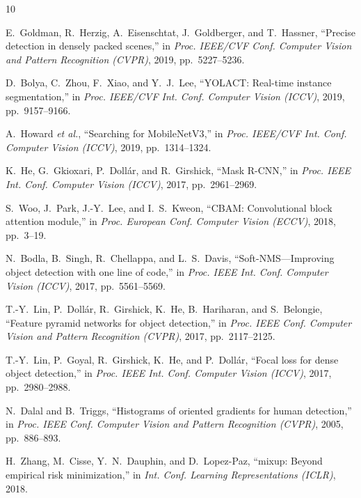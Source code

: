 \documentclass[conference]{IEEEtran}
\begin{document}
\begin{thebibliography}{10}

E.~Goldman, R.~Herzig, A.~Eisenschtat, J.~Goldberger, and T.~Hassner,
``Precise detection in densely packed scenes,''
in \emph{Proc. IEEE/CVF Conf. Computer Vision and Pattern Recognition (CVPR)}, 2019, pp.~5227--5236.

D.~Bolya, C.~Zhou, F.~Xiao, and Y.~J.~Lee,
``{YOLACT}: Real-time instance segmentation,''
in \emph{Proc. IEEE/CVF Int. Conf. Computer Vision (ICCV)}, 2019, pp.~9157--9166.

A.~Howard \emph{et al.},
``Searching for {MobileNetV3},''
in \emph{Proc. IEEE/CVF Int. Conf. Computer Vision (ICCV)}, 2019, pp.~1314--1324.

K.~He, G.~Gkioxari, P.~Doll{\'a}r, and R.~Girshick,
``Mask {R-CNN},''
in \emph{Proc. IEEE Int. Conf. Computer Vision (ICCV)}, 2017, pp.~2961--2969.

S.~Woo, J.~Park, J.-Y.~Lee, and I.~S.~Kweon,
``{CBAM}: Convolutional block attention module,''
in \emph{Proc. European Conf. Computer Vision (ECCV)}, 2018, pp.~3--19.

N.~Bodla, B.~Singh, R.~Chellappa, and L.~S.~Davis,
``Soft-{NMS}---Improving object detection with one line of code,''
in \emph{Proc. IEEE Int. Conf. Computer Vision (ICCV)}, 2017, pp.~5561--5569.

T.-Y.~Lin, P.~Doll{\'a}r, R.~Girshick, K.~He, B.~Hariharan, and S.~Belongie,
``Feature pyramid networks for object detection,''
in \emph{Proc. IEEE Conf. Computer Vision and Pattern Recognition (CVPR)}, 2017, pp.~2117--2125.

T.-Y.~Lin, P.~Goyal, R.~Girshick, K.~He, and P.~Doll{\'a}r,
``Focal loss for dense object detection,''
in \emph{Proc. IEEE Int. Conf. Computer Vision (ICCV)}, 2017, pp.~2980--2988.

N.~Dalal and B.~Triggs,
``Histograms of oriented gradients for human detection,''
in \emph{Proc. IEEE Conf. Computer Vision and Pattern Recognition (CVPR)}, 2005, pp.~886--893.

H.~Zhang, M.~Cisse, Y.~N.~Dauphin, and D.~Lopez-Paz,
``mixup: Beyond empirical risk minimization,''
in \emph{Int. Conf. Learning Representations (ICLR)}, 2018.

\end{thebibliography}
\end{document}

